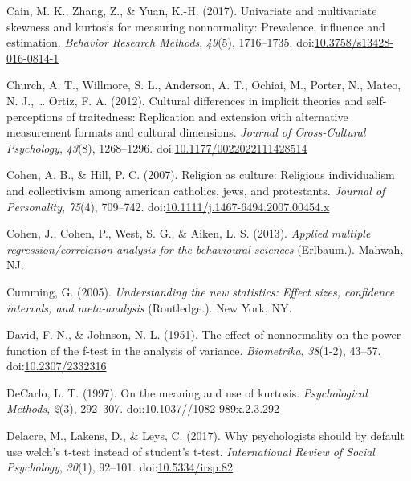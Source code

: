 \documentclass[man,floatsintext]{apa6}
\begin{document}
\leavevmode\hypertarget{ref-Cain_et_al_2016}{}%
Cain, M. K., Zhang, Z., \& Yuan, K.-H. (2017). Univariate and multivariate skewness and kurtosis for measuring nonnormality: Prevalence, influence and estimation. \emph{Behavior Research Methods}, \emph{49}(5), 1716--1735. doi:\href{https://doi.org/10.3758/s13428-016-0814-1}{10.3758/s13428-016-0814-1}

\leavevmode\hypertarget{ref-Church_et_al_2012}{}%
Church, A. T., Willmore, S. L., Anderson, A. T., Ochiai, M., Porter, N., Mateo, N. J., \ldots{} Ortiz, F. A. (2012). Cultural differences in implicit theories and self-perceptions of traitedness: Replication and extension with alternative measurement formats and cultural dimensions. \emph{Journal of Cross-Cultural Psychology}, \emph{43}(8), 1268--1296. doi:\href{https://doi.org/10.1177/0022022111428514}{10.1177/0022022111428514}

\leavevmode\hypertarget{ref-Cohen_and_Hill_2007}{}%
Cohen, A. B., \& Hill, P. C. (2007). Religion as culture: Religious individualism and collectivism among american catholics, jews, and protestants. \emph{Journal of Personality}, \emph{75}(4), 709--742. doi:\href{https://doi.org/10.1111/j.1467-6494.2007.00454.x\%20}{10.1111/j.1467-6494.2007.00454.x }

\leavevmode\hypertarget{ref-Cohen_et_al_2013}{}%
Cohen, J., Cohen, P., West, S. G., \& Aiken, L. S. (2013). \emph{Applied multiple regression/correlation analysis for the behavioural sciences} (Erlbaum.). Mahwah, NJ.

\leavevmode\hypertarget{ref-Cumming_2013}{}%
Cumming, G. (2005). \emph{Understanding the new statistics: Effect sizes, confidence intervals, and meta-analysis} (Routledge.). New York, NY.

\leavevmode\hypertarget{ref-David_and_Johnson_1951}{}%
David, F. N., \& Johnson, N. L. (1951). The effect of nonnormality on the power function of the f-test in the analysis of variance. \emph{Biometrika}, \emph{38}(1-2), 43--57. doi:\href{https://doi.org/10.2307/2332316}{10.2307/2332316}

\leavevmode\hypertarget{ref-DeCarlo_1997}{}%
DeCarlo, L. T. (1997). On the meaning and use of kurtosis. \emph{Psychological Methods}, \emph{2}(3), 292--307. doi:\href{https://doi.org/10.1037//1082-989x.2.3.292}{10.1037//1082-989x.2.3.292}

\leavevmode\hypertarget{ref-Delacre_et_al_2017}{}%
Delacre, M., Lakens, D., \& Leys, C. (2017). Why psychologists should by default use welch's t-test instead of student's t-test. \emph{International Review of Social Psychology}, \emph{30}(1), 92--101. doi:\href{https://doi.org/10.5334/irsp.82}{10.5334/irsp.82}
\end{document}
